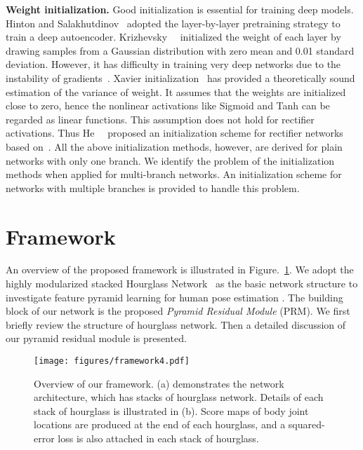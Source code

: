 \documentclass[10pt,twocolumn,letterpaper]{article}
\newcommand{\smalltitle}[1]{\vspace{0.2em}\noindent \textbf{{#1}}}
\begin{document}
\smalltitle{Weight initialization. }
Good initialization is essential for training deep models. 
Hinton and Salakhutdinov~\cite{hinton2006reducing} adopted the layer-by-layer pretraining strategy to train a deep autoencoder. 
Krizhevsky~\etal~\cite{krizhevsky2012imagenet} initialized the weight of each layer by drawing samples from a Gaussian distribution with zero mean and 0.01 standard deviation. 
However, it has difficulty in training very deep networks due to the instability of gradients~\cite{simonyan2014very}. 
Xavier initialization~\cite{glorot2010understanding} has provided a theoretically sound estimation of the variance of weight. 
It assumes that the weights are initialized close to zero, hence the nonlinear activations like Sigmoid and Tanh can be regarded as linear functions. 
This assumption does not hold for rectifier~\cite{nair2010rectified} activations. 
Thus He~\etal~\cite{he2015delving} proposed an initialization scheme for rectifier networks based on~\cite{glorot2010understanding}. 
All the above initialization methods, however, are derived for plain networks with only one branch. We identify the problem of the initialization methods when applied for multi-branch networks. 
An initialization scheme for networks with multiple branches is provided to handle this problem. 



\section{Framework}


An overview of the proposed framework is illustrated in Figure.~\ref{fig:framework}. 
We adopt the highly modularized stacked Hourglass Network~\cite{newell2016stacked} as the basic network structure to investigate feature pyramid learning for human pose estimation . 
The building block of our network is the proposed \textit{Pyramid Residual Module} (PRM). 
We first briefly review the structure of hourglass network. 
Then a detailed discussion of our pyramid residual module is presented.


\begin{figure}\begin{center}
		\texttt{[image: figures/framework4.pdf]}
	\end{center}
	\vspace{-0.5em}
	\caption{Overview of our framework. (a) demonstrates the network architecture, which has  stacks of hourglass network. Details of each stack of hourglass is illustrated in (b). 
		Score maps of body joint locations are produced at the end of each hourglass, and a squared-error loss is also attached in each stack of hourglass.}
	\label{fig:framework}
	\vspace{-1em}
\end{figure}
\end{document}
